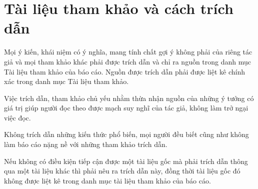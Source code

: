 \section{Tài liệu tham khảo và cách trích dẫn}

Mọi ý kiến, khái niệm có ý nghĩa, mang tính chất gợi ý không phải của riêng tác giả và mọi tham khảo khác phải được trích dẫn và chỉ ra nguồn trong danh mục Tài liệu tham khảo của báo cáo. Nguồn được trích dẫn phải được liệt kê chính xác trong danh mục Tài liệu tham khảo.

Việc trích dẫn, tham khảo chủ yếu nhằm thừa nhận nguồn của những ý tưởng có giá trị giúp người đọc theo được mạch suy nghĩ của tác giả, không làm trở ngại việc đọc.


Không trích dẫn những kiến thức phổ biến, mọi người đều biết cũng như không làm báo cáo nặng nề với những tham khảo trích dẫn.

Nếu không có điều kiện tiếp cận được một tài liệu gốc mà phải trích dẫn thông qua một tài liệu khác thì phải nêu ra trích dẫn này, đồng thời tài liệu gốc đó không được liệt kê trong danh mục tài liệu tham khảo của báo cáo.